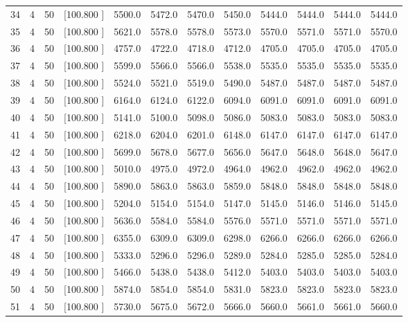 \documentclass[12pt,a4paper]{article}
\begin{document}
\begin{center}
{\begin{tabular}{r r r r r r r r r r r r}
  34&  4& 50&[100.800   ]&  5500.0&  5472.0&  5470.0&  5450.0&  5444.0&  5444.0&  5444.0&  5444.0\\[-0.02in]
  35&  4& 50&[100.800   ]&  5621.0&  5578.0&  5578.0&  5573.0&  5570.0&  5571.0&  5571.0&  5570.0\\[-0.02in]
  36&  4& 50&[100.800   ]&  4757.0&  4722.0&  4718.0&  4712.0&  4705.0&  4705.0&  4705.0&  4705.0\\[-0.02in]
  37&  4& 50&[100.800   ]&  5599.0&  5566.0&  5566.0&  5538.0&  5535.0&  5535.0&  5535.0&  5535.0\\[-0.02in]
  38&  4& 50&[100.800   ]&  5524.0&  5521.0&  5519.0&  5490.0&  5487.0&  5487.0&  5487.0&  5487.0\\[-0.02in]
  39&  4& 50&[100.800   ]&  6164.0&  6124.0&  6122.0&  6094.0&  6091.0&  6091.0&  6091.0&  6091.0\\[-0.02in]
  40&  4& 50&[100.800   ]&  5141.0&  5100.0&  5098.0&  5086.0&  5083.0&  5083.0&  5083.0&  5083.0\\[-0.02in]
  41&  4& 50&[100.800   ]&  6218.0&  6204.0&  6201.0&  6148.0&  6147.0&  6147.0&  6147.0&  6147.0\\[-0.02in]
  42&  4& 50&[100.800   ]&  5699.0&  5678.0&  5677.0&  5656.0&  5647.0&  5648.0&  5648.0&  5647.0\\[-0.02in]
  43&  4& 50&[100.800   ]&  5010.0&  4975.0&  4972.0&  4964.0&  4962.0&  4962.0&  4962.0&  4962.0\\[-0.02in]
  44&  4& 50&[100.800   ]&  5890.0&  5863.0&  5863.0&  5859.0&  5848.0&  5848.0&  5848.0&  5848.0\\[-0.02in]
  45&  4& 50&[100.800   ]&  5204.0&  5154.0&  5154.0&  5147.0&  5145.0&  5146.0&  5146.0&  5145.0\\[-0.02in]
  46&  4& 50&[100.800   ]&  5636.0&  5584.0&  5584.0&  5576.0&  5571.0&  5571.0&  5571.0&  5571.0\\[-0.02in]
  47&  4& 50&[100.800   ]&  6355.0&  6309.0&  6309.0&  6298.0&  6266.0&  6266.0&  6266.0&  6266.0\\[-0.02in]
  48&  4& 50&[100.800   ]&  5333.0&  5296.0&  5296.0&  5289.0&  5284.0&  5285.0&  5285.0&  5284.0\\[-0.02in]
  49&  4& 50&[100.800   ]&  5466.0&  5438.0&  5438.0&  5412.0&  5403.0&  5403.0&  5403.0&  5403.0\\[-0.02in]
  50&  4& 50&[100.800   ]&  5874.0&  5854.0&  5854.0&  5831.0&  5823.0&  5823.0&  5823.0&  5823.0\\[-0.02in]
  51&  4& 50&[100.800   ]&  5730.0&  5675.0&  5672.0&  5666.0&  5660.0&  5661.0&  5661.0&  5660.0\\[-0.02in]

\end{tabular}}
\end{center}
\end{document}
